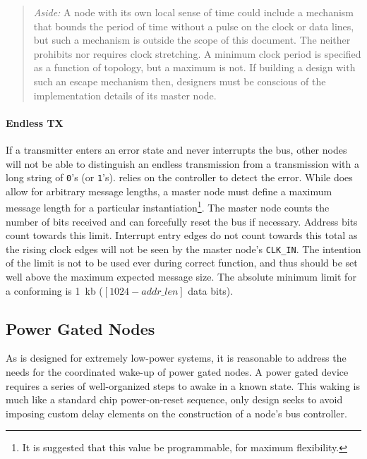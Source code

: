 \begin{quote}
\textit{Aside:}
A node with its own local sense of time could include a mechanism that bounds
the period of time without a pulse on the clock or data lines, but such a
mechanism is outside the scope of this document. The \bus neither prohibits
nor requires clock stretching. A minimum clock period is specified as a
function of \bus topology, but a maximum is not. If building a design with
such an escape mechanism then, designers must be conscious of the
implementation details of its master node.
\end{quote}

\paragraph{Endless TX}
\label{sec:reset-hung-endless-tx}
If a transmitter enters an error state and never interrupts the bus, other
nodes will not be able to distinguish an endless transmission from a
transmission with a long string of {\tt 0}'s (or {\tt 1}'s). \bus relies on
the controller to detect the error.  While \bus does allow for arbitrary
message lengths, a master node must define a maximum message length for a
particular \bus instantiation\footnote{
  It is suggested that this value be programmable, for maximum flexibility.
  }. The master node counts the number of bits received and can forcefully
reset the bus if necessary. Address bits count towards this limit. Interrupt
entry edges do not count towards this total as the rising clock edges will not
be seen by the master node's {\tt CLK\_IN}. The intention of the limit is not
to be used ever during correct \bus function, and thus should be set well
above the maximum expected message size. The absolute minimum limit for a
conforming \bus is 1~kb ($[1024 - addr\_len]$ data bits).

\subsection{Power Gated Nodes}
\label{sec:design-power-gated}
As \bus is designed for extremely low-power systems, it is reasonable to
address the needs for the coordinated wake-up of power gated nodes. A power
gated device requires a series of well-organized steps to awake in a known
state. This waking is much like a standard chip power-on-reset sequence, only
\bus design seeks to avoid imposing custom delay elements on the construction
of a node's bus controller.

